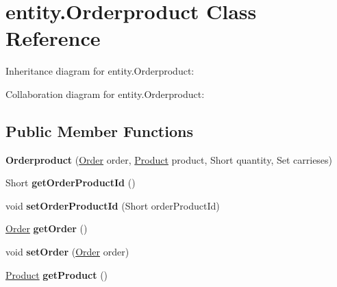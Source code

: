 \hypertarget{classentity_1_1_orderproduct}{}\section{entity.\+Orderproduct Class Reference}
\label{classentity_1_1_orderproduct}


Inheritance diagram for entity.\+Orderproduct\+:


Collaboration diagram for entity.\+Orderproduct\+:
\subsection*{Public Member Functions}
\begin{DoxyCompactItemize}
\item 
\mbox{\label{classentity_1_1_orderproduct_aa7b4b149ca0e7a7c850eb93b3eabf080}} 
{\bfseries Orderproduct} (\mbox{\hyperlink{classentity_1_1_order}{Order}} order, \mbox{\hyperlink{classentity_1_1_product}{Product}} product, Short quantity, Set carrieses)
\item 
\mbox{\label{classentity_1_1_orderproduct_a37306b78fb52723260670503a7bafe0a}} 
Short {\bfseries get\+Order\+Product\+Id} ()
\item 
\mbox{\label{classentity_1_1_orderproduct_aca397ed35c22c9ec511bef1d398810e6}} 
void {\bfseries set\+Order\+Product\+Id} (Short order\+Product\+Id)
\item 
\mbox{\label{classentity_1_1_orderproduct_af160d989a7a8c448ce983743a8ee1578}} 
\mbox{\hyperlink{classentity_1_1_order}{Order}} {\bfseries get\+Order} ()
\item 
\mbox{\label{classentity_1_1_orderproduct_ac38152f038c0669a8f2280c6f55fc1bb}} 
void {\bfseries set\+Order} (\mbox{\hyperlink{classentity_1_1_order}{Order}} order)
\item 
\mbox{\label{classentity_1_1_orderproduct_ac8a5d534f8433a8260ea87a85bb00217}} 
\mbox{\hyperlink{classentity_1_1_product}{Product}} {\bfseries get\+Product} ()
\item 
\mbox{\label{classentity_1_1_orderproduct_a4d9fd082a96c982443e6ad4cfb032a61}} 

\end{DoxyCompactItemize}
